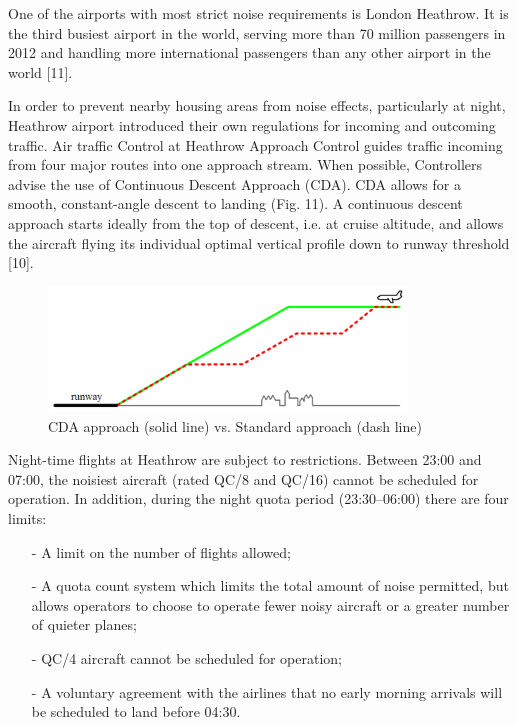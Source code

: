 One of the airports with most strict noise requirements is London Heathrow. It is the third busiest airport in the world, serving more than 70 million passengers in 2012 and handling more international passengers than any other airport in the world [11].

In order to prevent nearby housing areas from noise effects, particularly at night, Heathrow airport introduced their own regulations for incoming and outcoming traffic. Air traffic Control at Heathrow Approach Control guides traffic incoming from four major routes into one approach stream. When possible, Controllers advise the use of Continuous Descent Approach (CDA). CDA allows for a smooth, constant-angle descent to landing (Fig. 11). A continuous descent approach starts ideally from the top of descent, i.e. at cruise altitude, and allows the aircraft flying its individual optimal vertical profile down to runway threshold [10].

\begin{figure}[h!]
\centering %
\includegraphics[width=0.85\textwidth]{Pictures/cda.png}
\caption{CDA approach (solid line) vs. Standard approach (dash line)}
\label{cda}
\end{figure}

Night-time flights at Heathrow are subject to restrictions. Between 23:00 and 07:00, the noisiest aircraft (rated QC/8 and QC/16) cannot be scheduled for operation. In addition, during the night quota period (23:30–06:00) there are four limits:

\begin{itemize}
\item[-] A limit on the number of flights allowed;
\item[-] A quota count system which limits the total amount of noise permitted, but allows operators to choose to operate fewer noisy aircraft or a greater number of quieter planes;
\item[-] QC/4 aircraft cannot be scheduled for operation;
\item[-] A voluntary agreement with the airlines that no early morning arrivals will be scheduled to land before 04:30.
\end{itemize}

